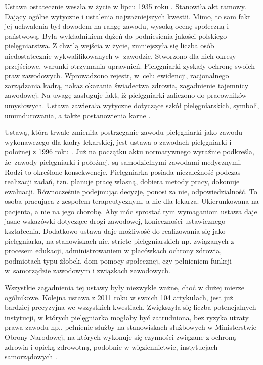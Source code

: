 \documentclass[a4paper,12pt,twoside,openright]{mwrep}
\begin{document}
Ustawa ostatecznie weszła w życie w lipcu 1935 roku \cite{usta}. Stanowiła akt ramowy. Dający ogólne wytyczne i ustalenia najważniejszych kwestii. Mimo, to sam fakt jej uchwalenia był dowodem na rangę zawodu, wysoką ocenę społeczną i państwową. Była wykładnikiem dążeń do podniesienia jakości polskiego pielęgniarstwa. Z chwilą wejścia w życie, zmniejszyła się liczba osób niedostatecznie wykwalifikowanych w~zawodzie. Stworzono dla nich okresy przejściowe, warunki otrzymania uprawnień. Pielęgniarki zyskały ochronę swoich praw zawodowych. Wprowadzono rejestr, w~celu ewidencji, racjonalnego zarządzania kadrą, nakaz okazania świadectwa zdrowia, zagadnienie tajemnicy zawodowej. Na uwagę zasługuje fakt, iż pielęgniarki zaliczono do pracowników umysłowych. Ustawa zawierała wytyczne dotyczące szkół pielęgniarskich, symboli, umundurowania, a także postanowienia karne \cite{1935}.

Ustawą, która trwale zmieniła postrzeganie zawodu pielęgniarki jako zawodu wykonawczego dla kadry lekarskiej, jest ustawa o zawodach pielęgniarki i położnej z 1996 roku \cite{1996}. Już na początku aktu normatywnego wyraźnie podkreśla, że~zawody pielęgniarki i położnej, są samodzielnymi zawodami medycznymi. Rodzi to określone konsekwencje. Pielęgniarka posiada niezależność podczas realizacji zadań, tzn. planuje pracę własną, dobiera metody pracy, dokonuje ewaluacji. Równocześnie podejmując decyzje, ponosi za nie, odpowiedzialność. To osoba pracująca z zespołem terapeutycznym, a nie dla lekarza. Ukierunkowana na pacjenta, a nie na jego chorobę. Aby móc sprostać tym wymaganiom ustawa daje jasne wskazówki dotyczące drogi zawodowej, konieczności ustawicznego kształcenia. Dodatkowo ustawa daje możliwość do realizowania się jako pielęgniarka, na stanowiskach nie, stricte pielęgniarskich np. związanych z procesem edukacji, administrowaniem w placówkach ochrony zdrowia, podmiotach typu żłobek, dom pomocy społecznej, czy pełnieniem funkcji w~samorządzie zawodowym i związkach zawodowych.

Wszystkie zagadnienia tej ustawy były niezwykle ważne, choć w dużej mierze ogólnikowe. Kolejna ustawa z 2011 roku w swoich 104 artykułach, jest już bardziej precyzyjna we wszystkich kwestiach. Zwiększyła się liczba potencjalnych instytucji, w których pielęgniarka mogłaby być zatrudniona, bez ryzyka utraty prawa zawodu np., pełnienie służby na stanowiskach służbowych w Ministerstwie Obrony Narodowej, na których wykonuje się czynności związane z ochroną zdrowia i opieką zdrowotną, podobnie w więziennictwie, instytucjach samorządowych \cite{2011}. 
\end{document}
